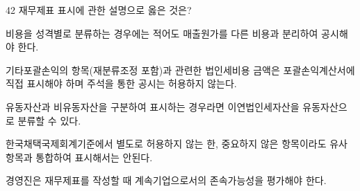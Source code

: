 \begin{question}{42}
재무제표 표시에 관한 설명으로 옳은 것은?
\begin{choices}
  \item 비용을 성격별로 분류하는 경우에는 적어도 매출원가를 다른 비용과 분리하여 공시해야 한다.
  \item 기타포괄손익의 항목(재분류조정 포함)과 관련한 법인세비용 금액은 포괄손익계산서에 직접 표시해야 하며 주석을 통한 공시는 허용하지 않는다.
  \item 유동자산과 비유동자산을 구분하여 표시하는 경우라면 이연법인세자산을 유동자산으로 분류할 수 있다.
  \item 한국채택국제회계기준에서 별도로 허용하지 않는 한, 중요하지 않은 항목이라도 유사항목과 통합하여 표시해서는 안된다.
  \item 경영진은 재무제표를 작성할 때 계속기업으로서의 존속가능성을 평가해야 한다.
\end{choices}
\end{question}
